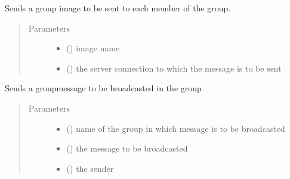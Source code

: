 \documentclass[letterpaper,10pt,english]{sphinxmanual}
\begin{document}
\begin{fulllineitems}
\label{\detokenize{client:client.send_group_image}}
Sends a group image to be sent to each member of the group.
\begin{quote}\begin{description}
\item[{Parameters}] \leavevmode\begin{itemize}
\item {} 
 () \textendash{} image name

\item {} 
 () \textendash{} the server connection to which the message is to be sent

\end{itemize}

\end{description}\end{quote}

\end{fulllineitems}


\begin{fulllineitems}
\label{\detokenize{client:client.send_group_text}}
Sends a groupmessage to be broadcasted in the group
\begin{quote}\begin{description}
\item[{Parameters}] \leavevmode\begin{itemize}
\item {} 
 () \textendash{} name of the group in which message is to be broadcasted

\item {} 
 () \textendash{} the message to be broadcasted

\item {} 
 () \textendash{} the sender

\end{itemize}

\end{description}\end{quote}

\end{fulllineitems}
\end{document}
